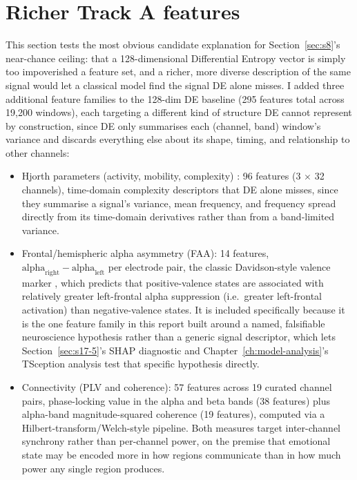 \documentclass[11pt]{report}
\begin{document}
\section{Richer Track A features}
\label{sec:s9}
This section tests the most obvious candidate explanation for
Section~\ref{sec:s8}'s near-chance ceiling: that a 128-dimensional
Differential Entropy vector is simply too impoverished a feature set, and a
richer, more diverse description of the same signal would let a classical
model find the signal DE alone misses. I added three additional feature
families to the 128-dim DE baseline (295 features total across 19{,}200
windows), each targeting a different kind of structure DE cannot represent
by construction, since DE only summarises each (channel, band) window's
variance and discards everything else about its shape, timing, and
relationship to other channels:
\begin{itemize}
  \item Hjorth parameters (activity, mobility, complexity)
        \citep{hjorth1970eeg}: 96 features (3 $\times$ 32 channels),
        time-domain complexity descriptors that DE alone misses, since they
        summarise a signal's variance, mean frequency, and frequency spread
        directly from its time-domain derivatives rather than from a
        band-limited variance.
  \item Frontal/hemispheric alpha asymmetry (FAA): 14 features,
        $\text{alpha}_{\text{right}} - \text{alpha}_{\text{left}}$ per
        electrode pair, the classic Davidson-style valence marker
        \citep{davidson1992anterior}, which predicts that positive-valence
        states are associated with relatively greater left-frontal alpha
        suppression (i.e.\ greater left-frontal activation) than
        negative-valence states. It is included specifically because it is
        the one feature family in this report built around a named,
        falsifiable neuroscience hypothesis rather than a generic signal
        descriptor, which lets Section~\ref{sec:s17-5}'s SHAP diagnostic and
        Chapter~\ref{ch:model-analysis}'s TSception analysis test that
        specific hypothesis directly.
  \item Connectivity (PLV and coherence): 57 features across 19 curated
        channel pairs, phase-locking value \citep{lachaux1999plv} in the
        alpha and beta bands (38 features) plus alpha-band
        magnitude-squared coherence (19 features), computed via a
        Hilbert-transform/Welch-style pipeline. Both measures target
        inter-channel synchrony rather than per-channel power, on the
        premise that emotional state may be encoded more in how regions
        communicate than in how much power any single region produces.
\end{itemize}
\end{document}
